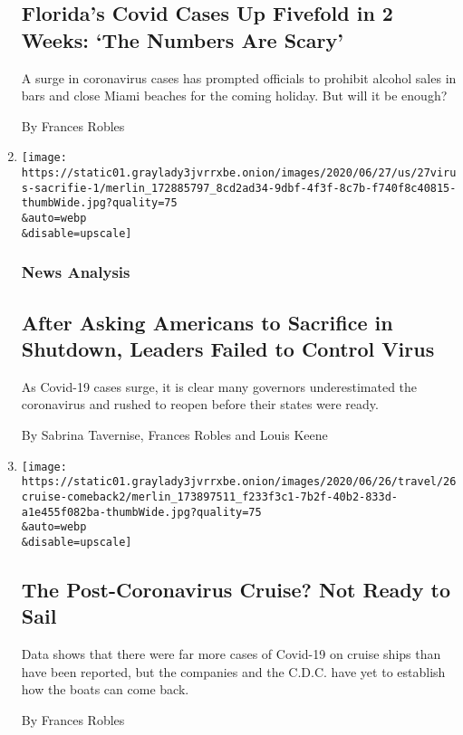 \begin{enumerate}
  \hypertarget{floridas-covid-cases-up-fivefold-in-2-weeks-the-numbers-are-scary}{%
  \subsection{Florida's Covid Cases Up Fivefold in 2 Weeks: `The Numbers
  Are
  Scary'}\label{floridas-covid-cases-up-fivefold-in-2-weeks-the-numbers-are-scary}}

  A surge in coronavirus cases has prompted officials to prohibit
  alcohol sales in bars and close Miami beaches for the coming holiday.
  But will it be enough?

  By Frances Robles
\item
  \href{/2020/06/27/us/after-asking-americans-to-sacrifice-in-shutdown-leaders-failed-to-control-virus.html}{}

  \texttt{[image: https://static01.graylady3jvrrxbe.onion/images/2020/06/27/us/27virus-sacrifie-1/merlin\_172885797\_8cd2ad34-9dbf-4f3f-8c7b-f740f8c40815-thumbWide.jpg?quality=75\\\&auto=webp\\\&disable=upscale]}

  \hypertarget{news-analysis}{%
  \subsubsection{News Analysis}\label{news-analysis}}

  \hypertarget{after-asking-americans-to-sacrifice-in-shutdown-leaders-failed-to-control-virus}{%
  \subsection{After Asking Americans to Sacrifice in Shutdown, Leaders
  Failed to Control
  Virus}\label{after-asking-americans-to-sacrifice-in-shutdown-leaders-failed-to-control-virus}}

  As Covid-19 cases surge, it is clear many governors underestimated the
  coronavirus and rushed to reopen before their states were ready.

  By Sabrina Tavernise, Frances Robles and Louis Keene
\item
  \href{/2020/06/26/travel/coronavirus-cruises-reopening.html}{}

  \texttt{[image: https://static01.graylady3jvrrxbe.onion/images/2020/06/26/travel/26cruise-comeback2/merlin\_173897511\_f233f3c1-7b2f-40b2-833d-a1e455f082ba-thumbWide.jpg?quality=75\\\&auto=webp\\\&disable=upscale]}

  \hypertarget{the-post-coronavirus-cruise-not-ready-to-sail}{%
  \subsection{The Post-Coronavirus Cruise? Not Ready to
  Sail}\label{the-post-coronavirus-cruise-not-ready-to-sail}}

  Data shows that there were far more cases of Covid-19 on cruise ships
  than have been reported, but the companies and the C.D.C. have yet to
  establish how the boats can come back.

  By Frances Robles
\end{enumerate}

